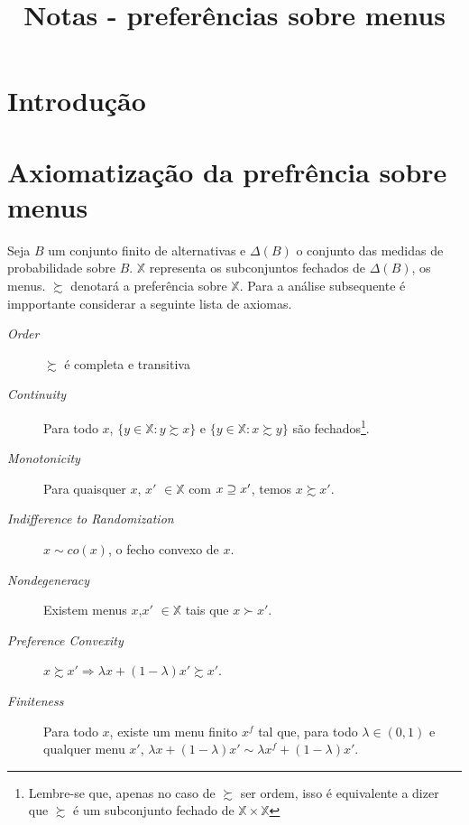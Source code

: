 \documentclass[11pt, a4paper]{article}
\title{Notas - preferências sobre menus}
\author{}
\theoremstyle{nonumberplain}
\theoremstyle{plain}
\theoremstyle{plain}
\theoremstyle{plain}
\begin{document}
\maketitle 

\tableofcontents

\section{Introdução}

\section{Axiomatização da prefrência sobre menus}
Seja $B$ um conjunto finito de alternativas e $\Delta(B)$ o conjunto das medidas de probabilidade sobre $B$. $\mathbb{X}$ representa os subconjuntos fechados de $\Delta(B)$, os menus. $\succsim$ denotará a preferência sobre $\mathbb{X}$. Para a análise subsequente é impportante considerar a seguinte lista de axiomas.
\begin{description}
\item [\textit{Order}] $\succsim$ é completa e transitiva  
\item [\textit{Continuity}] Para todo $x$, $\{y\in \mathbb{X}:y\succsim x\}$ e $\{y\in \mathbb{X}:x\succsim y\}$ são fechados\footnote{Lembre-se que, apenas no caso de $\succsim$ ser ordem, isso é equivalente a dizer que $\succsim$ é um subconjunto fechado de $\mathbb{X}\times\mathbb{X}$}. 
\item [\textit{Monotonicity}] Para quaisquer $x$, $x'$ $\in\mathbb{X}$ com $x\begin{small}\supseteq\end{small} x'$, temos $x\succsim x'$. 
\item [\textit{Indifference to Randomization}] $x\sim co(x)$, o fecho convexo de $x$. 
\item [\textit{Nondegeneracy}] Existem menus $x$,$x'$ $\in \mathbb{X}$ tais que $x\succ x'$.
\item [\textit{Preference Convexity}] $x\succsim x' \Rightarrow \lambda x +(1-\lambda)x'\succsim x'$.
\item[\textit{Finiteness}] Para todo $x$, existe um menu finito $x^f$ tal que, para todo $\lambda\in (0,1)$ e qualquer menu $x'$, $\lambda x +(1-\lambda)x' \sim \lambda x^f +(1-\lambda)x'$.
\end{description}  
\end{document}
